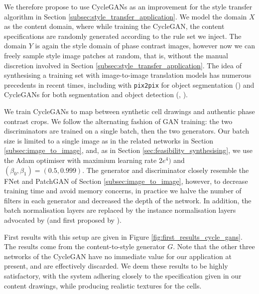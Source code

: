 We therefore propose to use CycleGANs as an improvement for the style transfer algorithm in Section \ref{subsec:style_transfer_application}. We model the domain $X$ as the content domain, where while training the CycleGAN, the content specifications are randomly generated according to the rule set we inject. The domain $Y$ is again the style domain of phase contrast images, however now we can freely sample style image patches at random, that is, without the manual discretion involved in Section \ref{subsec:style_transfer_application}. The idea of synthesising a training set with image-to-image translation models has numerous precedents in recent times, including with \texttt{pix2pix} for object segmentation (\cite{hollandi2019deep}) and CycleGANs for both segmentation and object detection (\cite{fu2018three}, \cite{ihle2019unsupervised}).

We train CycleGANs to map between synthetic cell drawings and authentic phase contrast crops. We follow the alternating fashion of GAN training: the two discriminators are trained on a single batch, then the two generators. Our batch size is limited to a single image as in the related networks in Section \ref{subsec:image_to_image}, and, as in Section \ref{sec:feasibility_synthesising}, we use the Adam optimiser with maximium learning rate $2e^{4})$ and $(\beta_0, \beta_1) = (0.5, 0.999)$. The generator and discriminator closely resemble the FNet and PatchGAN of Section \ref{subsec:image_to_image}, however, to decrease training time and avoid memory concerns, in practice we halve the number of filters in each generator and decreased the depth of the network. In addition, the batch normalisation layers are replaced by the instance normalisation layers advocated by \cite{isola2017image} (and first proposed by \cite{krizhevsky2012imagenet}).

First results with this setup are given in Figure \ref{fig:first_results_cycle_gans}. The results come from the content-to-style generator $G$. Note that the other three networks of the CycleGAN have no immediate value for our application at present, and are effectively discarded. We deem these results to be highly satisfactory, with the system adhering closely to the specification given in our content drawings, while producing realistic textures for the cells. 

